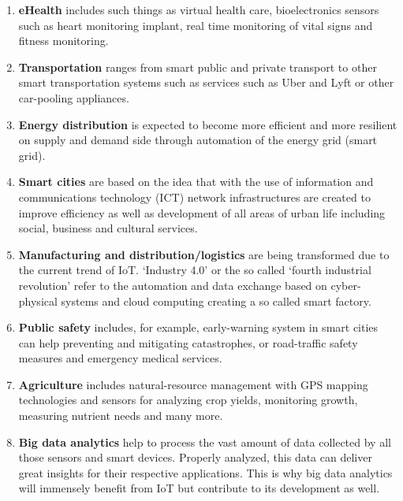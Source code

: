 		\begin{enumerate}
			\item \textbf{eHealth} includes such things as virtual health care, bioelectronics sensors such as heart monitoring implant, real time monitoring of vital signs and fitness monitoring.

			\item \textbf{Transportation} ranges from smart public and private transport to other smart transportation systems such as services such as Uber and Lyft or other car-pooling appliances.

			\item \textbf{Energy distribution} is expected to become more efficient and more resilient on supply and demand side through automation of the energy grid (smart grid).

			\item \textbf{Smart cities} are based on the idea that with the use of information and communications technology (ICT) network infrastructures are created to improve efficiency as well as development of all areas of urban life including social, business and cultural services.

			\item \textbf{Manufacturing and distribution/logistics} are being transformed due to the current trend of IoT. `Industry 4.0' or the so called `fourth industrial revolution' refer to the automation and data exchange based on cyber-physical systems and cloud computing creating a so called smart factory.

			\item \textbf{Public safety} includes, for example, early-warning system in smart cities can help preventing and mitigating catastrophes, or road-traffic safety measures and emergency medical services.

			\item \textbf{Agriculture} includes natural-resource management with GPS mapping technologies and sensors for analyzing crop yields, monitoring growth, measuring nutrient needs and many more. 

			\item \textbf{Big data analytics} help to process the vast amount of data collected by all those sensors and smart devices. Properly analyzed, this data can deliver great insights for their respective applications. This is why big data analytics will immensely benefit from IoT but contribute to its development as well.
		\end{enumerate}
